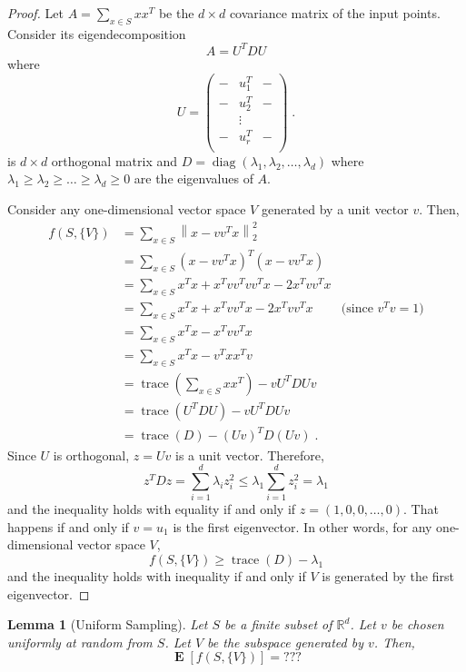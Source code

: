 \documentclass{article}
\newtheorem{lemma}[theorem]{Lemma}
\newcommand{\R}{\mathbb{R}}
\newcommand{\norm}[1]{\left\|#1\right\|}
\DeclareMathOperator*{\diag}{diag}
\DeclareMathOperator*{\trace}{trace}
\DeclareMathOperator*{\Exp}{\mathbf{E}}
\begin{document}
\begin{proof}
Let $A = \sum_{x \in S} xx^T$ be the $d \times d$
covariance matrix of the input points. Consider its eigendecomposition
$$
A = U^T D U
$$
where
$$
U =
\begin{pmatrix}
- & u_1^T & - \\
- & u_2^T & - \\
  & \vdots & \\
- & u_r^T & - \\
\end{pmatrix} \; .
$$
is $d \times d$ orthogonal matrix and $D = \diag(\lambda_1,
\lambda_2, \dots, \lambda_d)$ where $\lambda_1 \ge \lambda_2 \ge \dots \ge
\lambda_d \ge 0$ are the eigenvalues of $A$.

Consider any one-dimensional vector space $V$ generated by a unit vector $v$.
Then,
\begin{align*}
f(S, \{V\})
& = \sum_{x \in S} \norm{x - vv^T x}_2^2 \\
& = \sum_{x \in S} (x - vv^T x)^T (x - vv^Tx) \\
& = \sum_{x \in S} x^Tx + x^T vv^T vv^T x - 2 x^T vv^T x  \\
& = \sum_{x \in S} x^Tx + x^T vv^T x - 2 x^T vv^T x & \text{(since $v^Tv = 1$)} \\
& = \sum_{x \in S} x^Tx - x^T vv^T x  \\
& = \sum_{x \in S} x^Tx - v^T xx^T v  \\
& = \trace\left(\sum_{x \in S} xx^T \right) - v U^T D U v \\
& = \trace(U^T D U) - v U^T D U v \\
& = \trace(D) - (Uv)^T D (Uv) \; .
\end{align*}
Since $U$ is orthogonal, $z=Uv$ is a unit vector. Therefore,
$$
z^T D z = \sum_{i=1}^d \lambda_i z_i^2 \le \lambda_1 \sum_{i=1}^d z_i^2 = \lambda_1
$$
and the inequality holds with equality if and only if $z=(1,0,0,\dots,0)$.
That happens if and only if $v=u_1$ is the first eigenvector.
In other words, for any one-dimensional vector space $V$,
$$
f(S, \{V\}) \ge \trace(D) - \lambda_1
$$
and the inequality holds with inequality if and only if $V$ is generated
by the first eigenvector.
\end{proof}

\begin{lemma}[Uniform Sampling]
Let $S$ be a finite subset of $\R^d$. Let $v$ be chosen uniformly at random from $S$.
Let $V$ be the subspace generated by $v$. Then,
$$
\Exp[f(S,\{V\})] = ???
$$
\end{lemma}
\end{document}
